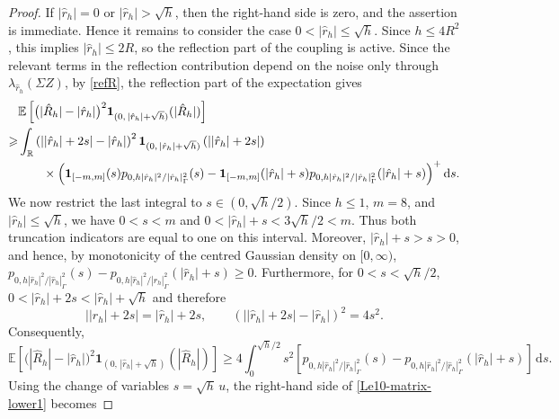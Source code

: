\documentclass[aap]{imsart}
\theoremstyle{plain}
\theoremstyle{definition}
\begin{document}
\begin{proof}
	If \(|\hat r_h|=0\) or \(|\hat r_h|>\sqrt h\), then the right-hand side is zero, and the assertion is
	immediate. Hence it remains to consider the case \(0<|\hat r_h|\leqslant \sqrt h\).
	Since \(h\leqslant 4R^2\), this implies \(|\hat r_h|\leqslant2R\),
	so the reflection part of the coupling is active. 
	Since the relevant
	terms in the reflection contribution depend on the noise only through
	\(\lambda_{\hat r_h}(\Sigma Z)\), by \eqref{refR}, the reflection part of the expectation gives
	\[
	\begin{aligned}
		&\mathbb E\left[
		\bigl(|\hat R_h|-|\hat r_h|\bigr)^2
		\mathbf 1_{(0,\,|\hat r_h|+\sqrt h)}
		(|\hat R_h|)
		\right] \\
		\geqslant&
		\int_{\mathbb R}
		\left(
		\left|
		|\hat r_h|+2s
		\right|
		-
		|\hat r_h|
		\right)^2
		\mathbf 1_{(0,\,|\hat r_h|+\sqrt h)}
		\left(
		\left|
		|\hat r_h|+2s
		\right|
		\right)                                                \\
		&\qquad\times
		\Bigl(
		\mathbf 1_{[-m,m]}(s)
		p_{0,h|\hat r_h|^2/|\hat r_h|_\Gamma^2}(s)
		-
		\mathbf 1_{[-m,m]}(|\hat r_h|+s)
		p_{0,h|\hat r_h|^2/|\hat r_h|_\Gamma^2}(|\hat r_h|+s)
		\Bigr)^+
		\,\mathrm ds .
	\end{aligned}
	\]
	We now restrict the last integral to \(s\in(0, \sqrt{h}/2)\).
	Since \(h\leqslant 1\), \(m=8\), and \(|\hat r_h|\leqslant\sqrt h\), we have \(0<s<m\) and \(0<|\hat r_h|+s<3\sqrt h/2<m\). Thus both truncation indicators are equal to one on this interval. Moreover, \(|\hat r_h|+s>s>0\), and hence, by monotonicity of the centred Gaussian density on \([0,\infty)\), \(p_{0,h|\hat r_h|^2/|\hat r_h|_\Gamma^2}(s)-
	p_{0,h|\hat r_h|^2/|\hat r_h|_\Gamma^2}(|\hat r_h|+s)
	\geqslant 0\).
	Furthermore, for \(0<s<\sqrt h/2\), \(0<
	|\hat r_h|+2s
	<
	|\hat r_h|+\sqrt h\) and therefore
	\[
	\left|
	|\hat r_h|+2s
	\right|
	=
	|\hat r_h|+2s,
	\qquad
	\left(
	\left|
	|\hat r_h|+2s
	\right|
	-
	|\hat r_h|
	\right)^2
	=
	4s^2 .
	\]
	Consequently,
	\begin{equation}\label{Le10-matrix-lower1}
			\mathbb E\left[
			\bigl(|\hat R_h|-|\hat r_h|\bigr)^2
			\mathbf 1_{(0,\,|\hat r_h|+\sqrt h)}
			(|\hat R_h|)
			\right]\geqslant
			4
			\int_0^{\sqrt h/2}
			s^2
			\left[
			p_{0,h|\hat r_h|^2/|\hat r_h|_\Gamma^2}(s)-
			p_{0,h|\hat r_h|^2/|\hat r_h|_\Gamma^2}(|\hat r_h|+s)
			\right]
			\,\mathrm ds .
	\end{equation}
Using the change of variables \(s=\sqrt h\,u\), the right-hand side of \eqref{Le10-matrix-lower1} becomes

\end{proof}
\end{document}
